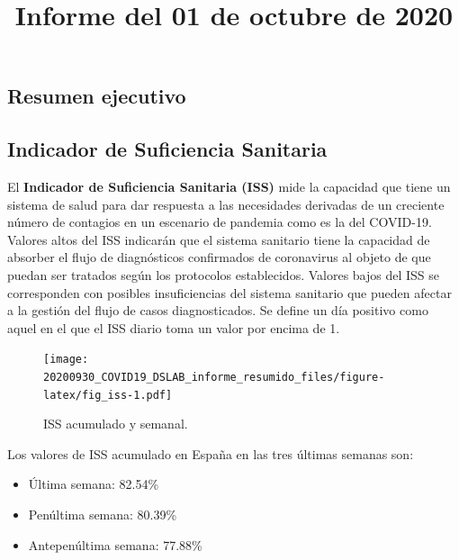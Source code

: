 \documentclass[
  11pt,
]{article}
\title{Informe del 01 de octubre de 2020}
\author{}
\date{\vspace{-2.5em}}
\providecommand{\tightlist}{%
  \setlength{\itemsep}{0pt}\setlength{\parskip}{0pt}}
\begin{document}
\maketitle

\renewcommand{\figurename}{Figura}
\renewcommand{\tablename}{Tabla}

\vspace{-0.5cm}

\hypertarget{resumen-ejecutivo}{%
\subsection{Resumen ejecutivo}\label{resumen-ejecutivo}}

\hypertarget{indicador-de-suficiencia-sanitaria}{%
\subsection{Indicador de Suficiencia
Sanitaria}\label{indicador-de-suficiencia-sanitaria}}

El \textbf{Indicador de Suficiencia Sanitaria (ISS)} mide la capacidad
que tiene un sistema de salud para dar respuesta a las necesidades
derivadas de un creciente número de contagios en un escenario de
pandemia como es la del COVID-19. Valores altos del ISS indicarán que el
sistema sanitario tiene la capacidad de absorber el flujo de
diagnósticos confirmados de coronavirus al objeto de que puedan ser
tratados según los protocolos establecidos. Valores bajos del ISS se
corresponden con posibles insuficiencias del sistema sanitario que
pueden afectar a la gestión del flujo de casos diagnosticados. Se define
un día positivo como aquel en el que el ISS diario toma un valor por
encima de 1.

\vspace{0.2cm}

\begin{figure}
\centering
\texttt{[image: 20200930\_COVID19\_DSLAB\_informe\_resumido\_files/figure-latex/fig\_iss-1.pdf]}
\caption{\label{fig:fig_iss} ISS acumulado y semanal.}
\end{figure}

Los valores de ISS acumulado en España en las tres últimas semanas son:

\begin{itemize}
\tightlist
\item
  Última semana: 82.54\%
\item
  Penúltima semana: 80.39\%
\item
  Antepenúltima semana: 77.88\%
\end{itemize}
\end{document}
